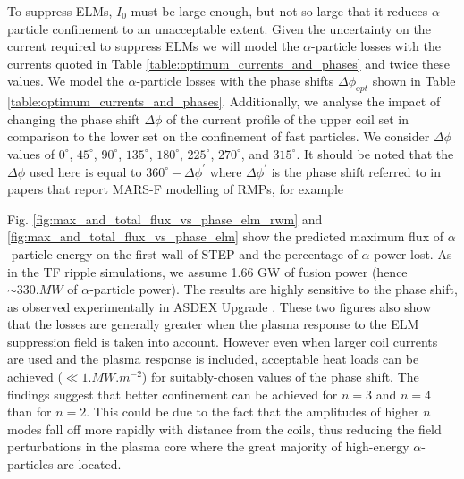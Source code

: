 \documentclass[10pt, a4paper, twoside]{article}
\begin{document}
To suppress ELMs, $I_0$ must be large enough, but not so large that it reduces $\alpha$-particle confinement to an unacceptable extent. Given the uncertainty on the current required to suppress ELMs we will model the $\alpha$-particle losses with the currents quoted in Table \ref{table:optimum_currents_and_phases} and twice these values.
We model the $\alpha$-particle losses with the phase shifts $\Delta\phi_{opt}$ shown in Table \ref{table:optimum_currents_and_phases}. Additionally, we analyse the impact of changing the phase shift $\Delta\phi$ of the current profile of the upper coil set in comparison to the lower set on the confinement of fast particles. We consider $\Delta\phi$ values of $0^\circ$, $45^\circ$, $90^\circ$, $135^\circ$, $180^\circ$, $225^\circ$, $270^\circ$, and $315^\circ$. It should be noted that the $\Delta\phi$ used here is equal to $360^{\circ}-\Delta\phi^{\prime}$ where $\Delta\phi^{\prime}$ is the phase shift referred to in papers that report MARS-F modelling of RMPs, for example \cite{ryan2017}   

Fig. \ref{fig:max_and_total_flux_vs_phase_elm_rwm} and \ref{fig:max_and_total_flux_vs_phase_elm} show the predicted maximum flux of $\alpha$-particle energy on the first wall of STEP and the percentage of $\alpha$-power lost. As in the TF ripple simulations, we assume 1.66 GW of fusion power (hence $\sim\si{330.MW}$ of $\alpha$-particle power). The results are highly sensitive to the phase shift, as observed experimentally in ASDEX Upgrade \cite{sanchis2018}. These two figures also show that the losses are generally greater when the plasma response to the ELM suppression field is taken into account. However even when larger coil currents are used and the plasma response is included, acceptable heat loads can be achieved ($\ll \si{1.MW.m^{-2}}$) for suitably-chosen values of the phase shift. The findings suggest that better confinement can be achieved for $n=3$ and $n=4$ than for $n=2$. This could be due to the fact that the amplitudes of higher $n$ modes fall off more rapidly with distance from the coils, thus reducing the field perturbations in the plasma core where the great majority of high-energy $\alpha$-particles are located.
\end{document}
